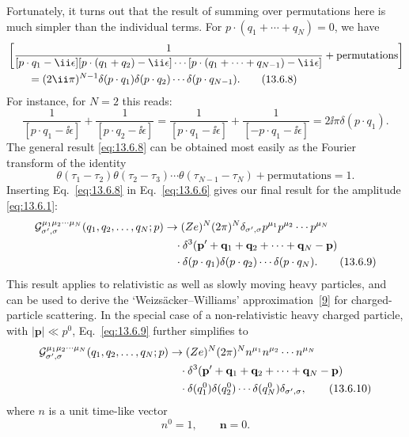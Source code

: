 Fortunately, it turns out that the result of summing over permutations
here is much simpler than the individual terms. For
$p\cdot(q_1+\cdots+q_N)=0$, we have
\begin{align}
&\left[
\frac{1}{[p\cdot q_1-\ii\epsilon]
[p\cdot(q_1+q_2)-\ii\epsilon]\cdots
[p\cdot(q_1+\cdots+q_{N-1})-\ii\epsilon]}
+\text{permutations}\right]
\notag\\
&\qquad=(2\ii\pi)^{N-1}\delta(p\cdot q_1)\delta(p\cdot q_2)
\cdots\delta(p\cdot q_{N-1}).
\tag{13.6.8}\label{eq:13.6.8}
\end{align}
For instance, for $N=2$ this reads:
\begin{equation*}
\frac{1}{[p\cdot q_1-\ii\epsilon]}+\frac{1}{[p\cdot q_2-\ii\epsilon]}
=\frac{1}{[p\cdot q_1-\ii\epsilon]}+\frac{1}{[-p\cdot q_1-\ii\epsilon]}
=2\ii\pi\delta(p\cdot q_1).
\end{equation*}
The general result \eqref{eq:13.6.8} can be obtained most easily as the Fourier
transform of the identity
\begin{equation*}
\theta(\tau_1-\tau_2)\theta(\tau_2-\tau_3)\cdots
\theta(\tau_{N-1}-\tau_N)+\text{permutations}=1.
\end{equation*}
Inserting Eq.~\eqref{eq:13.6.8} in Eq.~\eqref{eq:13.6.6} gives our final result for the amplitude
\eqref{eq:13.6.1}:
\begin{align}
\mathcal G^{\mu_1\mu_2\cdots\mu_N}_{\sigma',\sigma}
(q_1,q_2,\ldots,q_N;p)
&\to
(Ze)^N(2\pi)^N\delta_{\sigma',\sigma}
p^{\mu_1}p^{\mu_2}\cdots p^{\mu_N}
\notag\\
&\quad\cdot
\delta^3(\mathbf p'+\mathbf q_1+\mathbf q_2+\cdots+\mathbf q_N-\mathbf p)
\notag\\
&\quad\cdot
\delta(p\cdot q_1)\delta(p\cdot q_2)\cdots\delta(p\cdot q_N).
\tag{13.6.9}\label{eq:13.6.9}
\end{align}
This result applies to relativistic as well as slowly moving heavy particles,
and can be used to derive the `Weizs\"acker--Williams' approximation~\hyperref[ref:13.9]{[9]} for
charged-particle scattering. In the special case of a non-relativistic heavy
charged particle, with $|\mathbf p|\ll p^0$, Eq.~\eqref{eq:13.6.9} further simplifies to
\begin{align}
\mathcal G^{\mu_1\mu_2\cdots\mu_N}_{\sigma',\sigma}
(q_1,q_2,\ldots,q_N;p)
&\to
(Ze)^N(2\pi)^N n^{\mu_1}n^{\mu_2}\cdots n^{\mu_N}
\notag\\
&\quad\cdot
\delta^3(\mathbf p'+\mathbf q_1+\mathbf q_2+\cdots+\mathbf q_N-\mathbf p)
\notag\\
&\quad\cdot
\delta(q_1^0)\delta(q_2^0)\cdots\delta(q_N^0)\delta_{\sigma',\sigma},
\tag{13.6.10}\label{eq:13.6.10}
\end{align}
where $n$ is a unit time-like vector
\begin{equation*}
n^0=1,\qquad \mathbf n=0.
\end{equation*}

